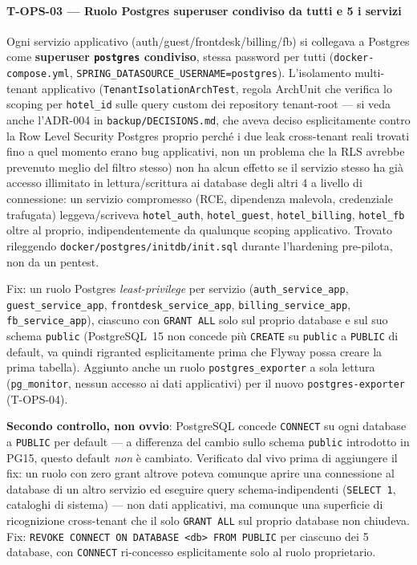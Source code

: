 ﻿\documentclass[a4paper,12pt]{report}
\begin{document}
\paragraph{T-OPS-03 --- Ruolo Postgres superuser condiviso da tutti e 5 i servizi}
Ogni servizio applicativo (auth/guest/frontdesk/billing/fb) si collegava a
Postgres come \textbf{superuser \texttt{postgres} condiviso}, stessa
password per tutti (\texttt{docker-compose.yml},
\texttt{SPRING\_DATASOURCE\_USERNAME=postgres}). L'isolamento
multi-tenant applicativo (\texttt{TenantIsolationArchTest}, regola ArchUnit
che verifica lo scoping per \texttt{hotel\_id} sulle query custom dei
repository tenant-root --- si veda anche l'ADR-004 in
\texttt{backup/DECISIONS.md}, che aveva deciso esplicitamente contro la
Row Level Security Postgres proprio perché i due leak cross-tenant reali
trovati fino a quel momento erano bug applicativi, non un problema che la
RLS avrebbe prevenuto meglio del filtro stesso) non ha alcun effetto se il
servizio stesso ha già accesso illimitato in lettura/scrittura ai database
degli altri 4 a livello di connessione: un servizio compromesso (RCE,
dipendenza malevola, credenziale trafugata) leggeva/scriveva
\texttt{hotel\_auth}, \texttt{hotel\_guest}, \texttt{hotel\_billing},
\texttt{hotel\_fb} oltre al proprio, indipendentemente da qualunque
scoping applicativo. Trovato rileggendo
\texttt{docker/postgres/initdb/init.sql} durante l'hardening
pre-pilota, non da un pentest.

Fix: un ruolo Postgres \emph{least-privilege} per servizio
(\texttt{auth\_service\_app}, \texttt{guest\_service\_app},
\texttt{frontdesk\_service\_app}, \texttt{billing\_service\_app},
\texttt{fb\_service\_app}), ciascuno con \texttt{GRANT ALL} solo sul
proprio database e sul suo schema \texttt{public} (PostgreSQL~15 non
concede più \texttt{CREATE} su \texttt{public} a \texttt{PUBLIC} di
default, va quindi rigranted esplicitamente prima che Flyway possa creare
la prima tabella). Aggiunto anche un ruolo \texttt{postgres\_exporter} a
sola lettura (\texttt{pg\_monitor}, nessun accesso ai dati applicativi)
per il nuovo \texttt{postgres-exporter} (T-OPS-04).

\textbf{Secondo controllo, non ovvio}: PostgreSQL concede
\texttt{CONNECT} su ogni database a \texttt{PUBLIC} per default --- a
differenza del cambio sullo schema \texttt{public} introdotto in PG15,
questo default \emph{non} è cambiato. Verificato dal vivo prima di
aggiungere il fix: un ruolo con zero grant altrove poteva comunque aprire
una connessione al database di un altro servizio ed eseguire query
schema-indipendenti (\texttt{SELECT 1}, cataloghi di sistema) --- non
dati applicativi, ma comunque una superficie di ricognizione cross-tenant
che il solo \texttt{GRANT ALL} sul proprio database non chiudeva. Fix:
\texttt{REVOKE CONNECT ON DATABASE <db> FROM PUBLIC} per ciascuno dei 5
database, con \texttt{CONNECT} ri-concesso esplicitamente solo al ruolo
proprietario.
\end{document}
